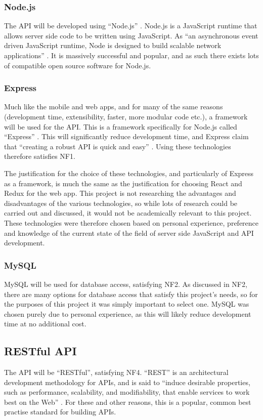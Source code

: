 \documentclass[11pt,openright,a4paper]{report}
\begin{document}
\subsubsection{Node.js}
The API will be developed using \enquote{Node.js} \parencite{nodejs}. Node.js is a JavaScript runtime that allows server side code to be written using JavaScript. As \enquote{an asynchronous event driven JavaScript runtime, Node is designed to build scalable network applications} \parencite{nodejsabout}. It is massively successful and popular, and as such there exists lots of compatible open source software for Node.js.

\subsubsection{Express}
Much like the mobile and web apps, and for many of the same reasons (development time, extensibility, faster, more modular code etc.), a framework will be used for the API. This is a framework specifically for Node.js called \enquote{Express} \parencite{expressjs}. This will significantly reduce development time, and Express claim that \enquote{creating a robust API is quick and easy} \parencite{expressjs}. Using these technologies therefore satisfies NF1.

The justification for the choice of these technologies, and particularly of Express as a framework, is much the same as the justification for choosing React and Redux for the web app. This project is not researching the advantages and disadvantages of the various technologies, so while lots of research could be carried out and discussed, it would not be academically relevant to this project. These technologies were therefore chosen based on personal experience, preference and knowledge of the current state of the field of server side JavaScript and API development.

\subsubsection{MySQL}
MySQL will be used for database access, satisfying NF2. As discussed in NF2, there are many options for database access that satisfy this project's needs, so for the purposes of this project it was simply important to select one. MySQL was chosen purely due to personal experience, as this will likely reduce development time at no additional cost.

\subsection{RESTful API}
The API will be \enquote{RESTful}, satisfying NF4. \enquote{REST} is an architectural development methodology for APIs, and is said to \enquote{induce desirable properties, such as performance, scalability, and modifiability, that enable services to work best on the Web} \parencite{oraclerest}. For these and other reasons, this is a popular, common best practise standard for building APIs.
\end{document}

